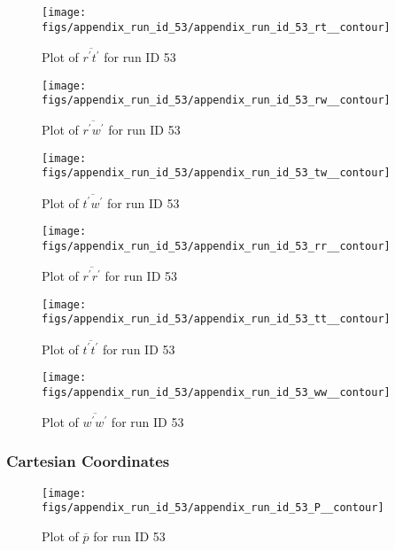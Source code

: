 \begin{figure}[H]
\centering
\texttt{[image: figs/appendix\_run\_id\_53/appendix\_run\_id\_53\_rt\_\_contour]}
\caption{Plot of $\overline{r^\prime t^\prime}$ for run ID 53}
\label{fig:appendix_run_id_53_rt__contour}
\end{figure}


\begin{figure}[H]
\centering
\texttt{[image: figs/appendix\_run\_id\_53/appendix\_run\_id\_53\_rw\_\_contour]}
\caption{Plot of $\overline{r^\prime w^\prime}$ for run ID 53}
\label{fig:appendix_run_id_53_rw__contour}
\end{figure}


\begin{figure}[H]
\centering
\texttt{[image: figs/appendix\_run\_id\_53/appendix\_run\_id\_53\_tw\_\_contour]}
\caption{Plot of $\overline{t^\prime w^\prime}$ for run ID 53}
\label{fig:appendix_run_id_53_tw__contour}
\end{figure}


\begin{figure}[H]
\centering
\texttt{[image: figs/appendix\_run\_id\_53/appendix\_run\_id\_53\_rr\_\_contour]}
\caption{Plot of $\overline{r^\prime r^\prime}$ for run ID 53}
\label{fig:appendix_run_id_53_rr__contour}
\end{figure}


\begin{figure}[H]
\centering
\texttt{[image: figs/appendix\_run\_id\_53/appendix\_run\_id\_53\_tt\_\_contour]}
\caption{Plot of $\overline{t^\prime t^\prime}$ for run ID 53}
\label{fig:appendix_run_id_53_tt__contour}
\end{figure}


\begin{figure}[H]
\centering
\texttt{[image: figs/appendix\_run\_id\_53/appendix\_run\_id\_53\_ww\_\_contour]}
\caption{Plot of $\overline{w^\prime w^\prime}$ for run ID 53}
\label{fig:appendix_run_id_53_ww__contour}
\end{figure}


\subsubsection{Cartesian Coordinates}
\begin{figure}[H]
\centering
\texttt{[image: figs/appendix\_run\_id\_53/appendix\_run\_id\_53\_P\_\_contour]}
\caption{Plot of $\overline{p}$ for run ID 53}
\label{fig:appendix_run_id_53_P__contour}
\end{figure}


